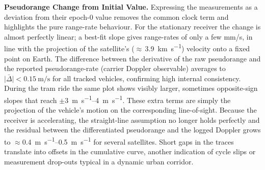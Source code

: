         \vspace{0.5em}
        \textbf{Pseudorange Change from Initial Value.} 
        Expressing the measurements as a deviation from their epoch-0 value removes the common
        clock term and highlights the pure range-rate behaviour.  For the stationary receiver the
        change is almost perfectly linear; a best-fit slope gives range-rates of only a few
        \si{mm/s}, in line with the projection of the satellite’s
        ($\approx$\,\SI{3.9}{\kilo\metre\per\second}) velocity onto a fixed point on Earth.
        The difference between the derivative of the raw pseudorange and the reported
        pseudorange-rate (carrier Doppler observable) averages to
        $\lvert\bar{\Delta}\rvert<\SI{0.15}{\metre\per\second}$ for all tracked vehicles,
        confirming high internal consistency.\\[2pt]
        During the tram ride the same plot shows visibly larger, sometimes opposite-sign slopes
        that reach $\pm$\SI{3}{\metre\per\second}–\SI{4}{\metre\per\second}.
        These extra terms are simply the projection of the vehicle’s motion on the corresponding
        line-of-sight.  Because the receiver is accelerating, the straight-line assumption no
        longer holds perfectly and the residual between the differentiated pseudorange and the
        logged Doppler grows to $\approx$\SI{0.4}{\metre\per\second}–\SI{0.5}{\metre\per\second}
        for several satellites.  Short gaps in the traces translate into offsets in the cumulative
        curve, another indication of cycle slips or measurement drop-outs typical in a dynamic
        urban corridor.


